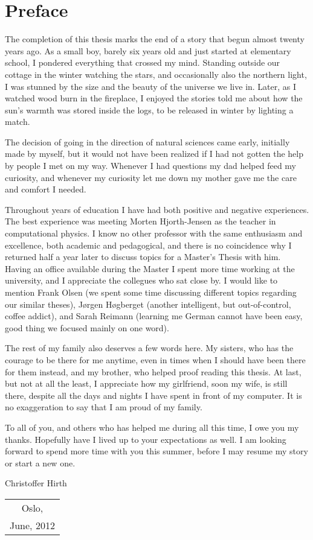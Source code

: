 \chapter*{Preface}
The completion of this thesis marks the end of a story that begun almost twenty years ago.
As a small boy, barely six years old and just started at elementary school, I pondered everything that crossed my mind.
Standing outside our cottage in the winter watching the stars, and occasionally also the northern light, I was stunned by the size and the beauty of the universe we live in.
Later, as I watched wood burn in the fireplace, I enjoyed the stories told me about how the sun's warmth was stored inside the logs, to be released in winter by lighting a match.

 
The decision of going in the direction of natural sciences came early, initially made by myself, but it would not have been realized if I had not gotten the help by people I met on my way.
Whenever I had questions my dad helped feed my curiosity, and whenever my curiosity let me down my mother gave me the care and comfort I needed.

 
Throughout years of education I have had both positive and negative experiences.
The best experience was meeting Morten Hjorth-Jensen as the teacher in computational physics.
I know no other professor with the same enthusiasm and excellence, both academic and pedagogical, and there is no coincidence why I returned half a year later to discuss topics for a Master's Thesis with him.
Having an office available during the Master I spent more time working at the university, and I appreciate the collegues who sat close by.
I would like to mention Frank Olsen (we spent some time discussing different topics regarding our similar theses), Jørgen Høgberget (another intelligent, but out-of-control, coffee addict), and Sarah Reimann (learning me German cannot have been easy, good thing we focused mainly on one word).

 
The rest of my family also deserves a few words here. 
My sisters, who has the courage to be there for me anytime, even in times when I should have been there for them instead, and my brother, who helped proof reading this thesis.
At last, but not at all the least, I appreciate how my girlfriend, soon my wife, is still there, despite all the days and nights I have spent in front of my computer.
It is no exaggeration to say that I am proud of my family.

 
To all of you, and others who has helped me during all this time, I owe you my thanks.
Hopefully have I lived up to your expectations as well.
I am looking forward to spend more time with you this summer, before I may resume my story or start a new one.




\begin{flushright}
Christoffer Hirth
\end{flushright}

\begin{tabular}{c}
Oslo,\\
June, 2012
\end{tabular}



